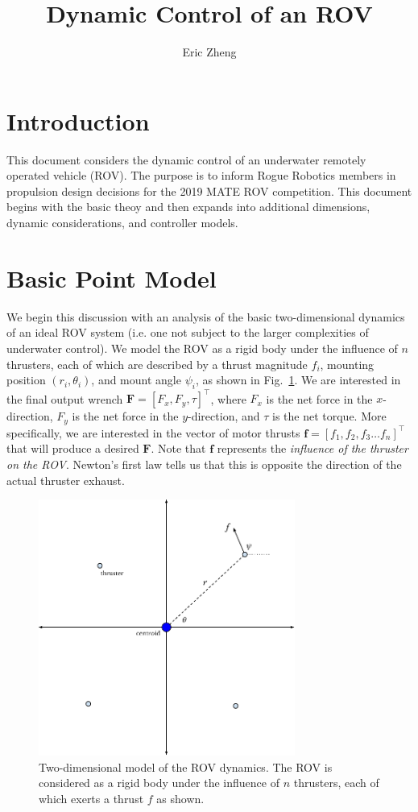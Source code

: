 \documentclass{article}
\title{Dynamic Control of an ROV}
\author{Eric Zheng}
\renewcommand{\vec}[1]{\mathbf{#1}}
\newcommand{\trans}[1]{#1^\intercal}
\begin{document}
\maketitle

\section{Introduction}
This document considers the dynamic control of an underwater remotely operated vehicle (ROV). The purpose is to inform Rogue Robotics members in propulsion design decisions for the 2019 MATE ROV competition. This document begins with the basic theoy and then expands into additional dimensions, dynamic considerations, and controller models.

\section{Basic Point Model}
We begin this discussion with an analysis of the basic two-dimensional dynamics of an ideal ROV system (i.e. one not subject to the larger complexities of underwater control). We model the ROV as a rigid body under the influence of $n$ thrusters, each of which are described by a thrust magnitude $f_i$, mounting position $(r_i, \theta_i)$, and mount angle $\psi_i$, as shown in Fig.~\ref{2d}. We are interested in the final output wrench $\vec{F} = \trans{[F_x, F_y, \tau]}$, where $F_x$ is the net force in the $x$-direction, $F_y$ is the net force in the $y$-direction, and $\tau$ is the net torque. More specifically, we are interested in the vector of motor thrusts $\vec{f} = \trans{[f_1, f_2, f_3 \dots f_n]}$ that will produce a desired $\vec{F}$. Note that $\vec{f}$ represents the \emph{influence of the thruster on the ROV}. Newton's first law tells us that this is opposite the direction of the actual thruster exhaust.

\begin{figure}[ht]
  \centering
  \includegraphics[width=0.75\textwidth]{fig_2d.pdf}
  \caption{Two-dimensional model of the ROV dynamics. The ROV is considered as a rigid body under the influence of $n$ thrusters, each of which exerts a thrust $f$ as shown.}
  \label{2d}
\end{figure}
\end{document}
